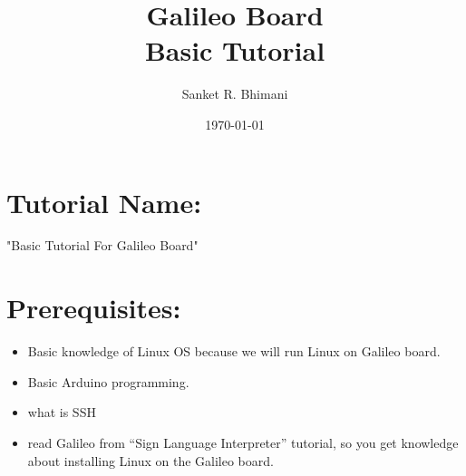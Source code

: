 \documentclass[11pt,a4paper]{article}
\title{\textbf{\Huge{Galileo Board}}\vspace{6mm}\\Basic Tutorial}
\author{Sanket R. Bhimani}
\date{\today}
\newcommand\tab[1][1cm]{\hspace*{#1}}
\begin{document}
	\maketitle
	\newpage
	\tableofcontents
	\newpage
	\section{Tutorial Name:}
	\begin{center}\huge{"Basic Tutorial For Galileo Board"}\end{center}
	\tab{This tutorial will help you to do basic interfacing with Galileo board. This board is new to market. So, you will not get enough resources to complete your tasks.}

    \vspace{15mm}
	\section{Prerequisites:}
	\vspace{1cm}
		\begin{itemize}
	    \item 	Basic knowledge of Linux OS because we will run Linux on Galileo board. 
	    \item 	Basic Arduino programming. 
	    \item 	what is SSH
	    \item	read Galileo from “Sign Language Interpreter” tutorial, so you get knowledge about installing Linux on the Galileo board.
	\end{itemize}
    \newpage
\end{document}
